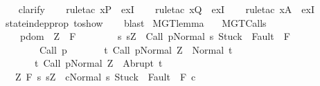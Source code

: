 \begin{isabellebody}
\ \ \isamarkupfalse%
\ {\isacharparenleft}clarify{\isacharparenright}\isanewline
\ \ \isamarkupfalse%
\ {\isacharparenleft}rule{\isacharunderscore}tac\ x{\isacharequal}{\isachardoublequoteopen}P{\isachardoublequoteclose}\ \ exI{\isacharparenright}\isanewline
\ \ \isamarkupfalse%
\ {\isacharparenleft}rule{\isacharunderscore}tac\ x{\isacharequal}{\isachardoublequoteopen}Q{\isachardoublequoteclose}\ \ exI{\isacharparenright}\isanewline
\ \ \isamarkupfalse%
\ {\isacharparenleft}rule{\isacharunderscore}tac\ x{\isacharequal}{\isachardoublequoteopen}A{\isachardoublequoteclose}\ \ exI{\isacharparenright}\isanewline
\ \ \isamarkupfalse%
\ state{\isacharunderscore}indep{\isacharunderscore}prop\ to{\isacharunderscore}show\isanewline
\ \ \isamarkupfalse%
\ blast%
\endisatagproof
{\isafoldproof}%
%
\isadelimproof
\isanewline
%
\endisadelimproof
\isanewline
\isanewline
{}\isamarkupfalse%
\ MGT{\isacharunderscore}lemma{\isacharcolon}\isanewline
\ \ \ MGT{\isacharunderscore}Calls{\isacharcolon}\ \isanewline
\ \ \ \ {\isachardoublequoteopen}{\isasymforall}p{\isasymin}dom\ {\isasymGamma}{\isachardot}\ {\isasymforall}Z{\isachardot}\ {\isasymGamma}{\isacharcomma}{\isasymTheta}\ {\isasymturnstile}\isactrlbsub {\isacharslash}F\isactrlesub \ \isanewline
\ \ \ \ \ \ \ {\isacharbraceleft}s{\isachardot}\ s{\isacharequal}Z\ {\isasymand}\ {\isasymGamma}{\isasymturnstile}{\isasymlangle}Call\ p{\isacharcomma}Normal\ s{\isasymrangle}\ {\isasymRightarrow}{\isasymnotin}{\isacharparenleft}{\isacharbraceleft}Stuck{\isacharbraceright}\ {\isasymunion}\ Fault\ {\isacharbackquote}\ {\isacharparenleft}{\isacharminus}F{\isacharparenright}{\isacharparenright}{\isacharbraceright}\isanewline
\ \ \ \ \ \ \ \ {\isacharparenleft}Call\ p{\isacharparenright}\isanewline
\ \ \ \ \ \ \ {\isacharbraceleft}t{\isachardot}\ {\isasymGamma}{\isasymturnstile}{\isasymlangle}Call\ p{\isacharcomma}Normal\ Z{\isasymrangle}\ {\isasymRightarrow}\ Normal\ t{\isacharbraceright}{\isacharcomma}\isanewline
\ \ \ \ \ \ \ {\isacharbraceleft}t{\isachardot}\ {\isasymGamma}{\isasymturnstile}{\isasymlangle}Call\ p{\isacharcomma}Normal\ Z{\isasymrangle}\ {\isasymRightarrow}\ Abrupt\ t{\isacharbraceright}{\isachardoublequoteclose}\isanewline
\ \ \ {\isachardoublequoteopen}{\isasymAnd}Z{\isachardot}\ {\isasymGamma}{\isacharcomma}{\isasymTheta}{\isasymturnstile}\isactrlbsub {\isacharslash}F\isactrlesub \ {\isacharbraceleft}s{\isachardot}\ s{\isacharequal}Z\ {\isasymand}\ {\isasymGamma}{\isasymturnstile}{\isasymlangle}c{\isacharcomma}Normal\ s{\isasymrangle}\ {\isasymRightarrow}{\isasymnotin}{\isacharparenleft}{\isacharbraceleft}Stuck{\isacharbraceright}\ {\isasymunion}\ Fault\ {\isacharbackquote}\ {\isacharparenleft}{\isacharminus}F{\isacharparenright}{\isacharparenright}{\isacharbraceright}\ c\ \isanewline

\end{isabellebody}
